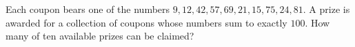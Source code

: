 Each coupon bears one of the numbers $9,12,42,57,69,21,15,75,24,81$. A prize is awarded for a collection of coupons whose numbers sum to exactly $100$. How many of ten available prizes can be claimed?
